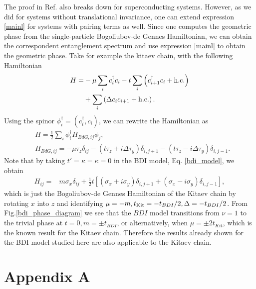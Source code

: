 \documentclass[prb,twocolumn,amsmath,amssymb,superscriptaddress]{revtex4-1}
\begin{document}
The proof in Ref.\cite{Zaletel2014} also breaks down for superconducting systems. However, as we did for systems without translational invariance, one can extend expression \ref{mainl} for systems with pairing terms as well. Since one computes the geometric phase from the single-particle Bogoliubov-de Gennes Hamiltonian, we can obtain the correspondent entanglement spectrum and use expression \ref{mainl} to obtain the geometric phase. Take for example the kitaev chain, with the following Hamiltonian
\begin{align*}
H =& -\mu \sum_{i} c_i^\dagger c_i - t \sum_{i}\left( c_{i+1}^\dagger c_i + {\rm h.c.}\right) \\
&+  \sum_{i}\left( \Delta c_{i} c_{i+1} + {\rm h.c.}\right).
\end{align*}
Using the spinor $\phi_i^\dagger = (c_i^\dagger, c_i)$, we can rewrite the Hamiltonian as
\begin{align*}
&H = \frac{1}{2}\sum_i \phi^\dagger_i H_{BdG,ij} \phi_j,\\
&H_{BdG,ij} = -\mu \tau_z \delta_{ij} - (t \tau_z + i\Delta \tau_y )\delta_{i,j+1}- (t \tau_z - i\Delta \tau_y)\delta_{i,j-1}.
\end{align*}
Note that by taking $t' = \kappa = \kappa = 0$ in the BDI model, Eq. \ref{bdi_model}, we obtain
\begin{align*}
H_{ij} =& m \sigma_x\delta_{ij} + \frac{1}{2} t \left[(\sigma_x + i \sigma_y)\delta_{i,j+1} + (\sigma_x - i \sigma_y) \delta_{i,j-1} \right],
\end{align*}
which is just the Bogoliubov-de Gennes Hamiltonian of the Kitaev chain by rotating $x$ into $z$ and identifying $\mu = -m, t_{\rm Kit} = -t_{BDI}/2, \Delta = -t_{BDI}/2 $. From Fig.\ref{bdi_phase_diagram} we see that the $BDI$ model transitions from $\nu = 1$ to the trivial phase at $t=0, m=\pm t_{BDI}$, or alternatively, when $\mu = \pm 2 t_{Kit}$, which is the known result for the Kitaev chain. Therefore the results already shown for the BDI model studied here are also applicable to the Kitaev chain.  

{}

	
\appendix

\section{Appendix A}
	
\end{document}
